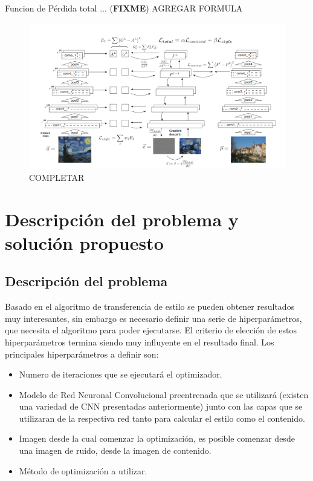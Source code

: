 \documentclass[a4paper,11pt,spanish]{book}
\newcommand*{\FIXME}[1]{{(\textbf{FIXME}) {#1}}}
\begin{document}
      Funcion de Pérdida total ...
      \FIXME{AGREGAR FORMULA}\\
      \begin{figure}[h]
	\includegraphics[scale=0.8]{./img/gatys_2.png}
	\caption{COMPLETAR}
	\label{fig:stanford_challenges}
      \end{figure}
    
     
\chapter{Descripción del problema y solución propuesto}
  \section{Descripción del problema}
    Basado en el algoritmo de transferencia de estilo se pueden obtener resultados muy interesantes, sin embargo es necesario definir una serie de hiperparámetros,
    que necesita el algoritmo para poder ejecutarse. El criterio de elección de estos hiperparámetros termina siendo muy influyente en el resultado final. 
    Los principales hiperparámetros a definir son:
    \begin{itemize}
      \item Numero de iteraciones que se ejecutará el optimizador.
      \item Modelo de Red Neuronal Convolucional preentrenada que se utilizará (existen una variedad de CNN presentadas anteriormente) junto con las capas que se utilizaran de la 
      respectiva red tanto para calcular el estilo como el contenido.
      \item Imagen desde la cual comenzar la optimización, es posible comenzar desde una imagen de ruido, desde la imagen de contenido.
      \item Método de optimización a utilizar.
    \end{itemize}
\end{document}
